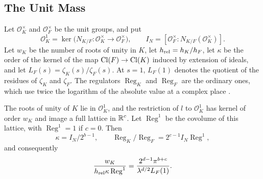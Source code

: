 \subsection{The Unit Mass}

Let $\mathcal O_K^\times$ and $\mathcal O_F^\times$ be the unit groups,
and put
\[
 \mathcal O_K^1=\ker\bigl(N_{K/F}\colon\mathcal O_K^\times\to
 \mathcal O_F^\times\bigr),
 \qquad I_N=[\mathcal O_F^\times:N_{K/F}(\mathcal O_K^\times)].
\]
Let $w_K$ be the number of roots of unity in $K$, let
$h_{\rm rel}=h_K/h_F$, let $\kappa$ be the order of the kernel of the
map $\operatorname{Cl}(F)\to\operatorname{Cl}(K)$ induced by extension of ideals, and let
$L_F(s)=\zeta_K(s)/\zeta_F(s)$. At $s=1$, $L_F(1)$ denotes the quotient
of the residues of $\zeta_K$ and $\zeta_F$. The regulators
$\operatorname{Reg}_K$ and $\operatorname{Reg}_F$ are the ordinary ones,
which use twice the logarithm of the absolute value at a complex place
\cite[Chapter~5]{MilneANT}.

\begin{proposition}\label{geo:mass}
The roots of unity of $K$ lie in $\mathcal O_K^1$, and the restriction of
$l$ to $\mathcal O_K^1$ has kernel of order $w_K$ and image a full
lattice in $\mathbb R^c$. Let $\operatorname{Reg}^1$ be the covolume of this
lattice, with $\operatorname{Reg}^1=1$ if $c=0$. Then
\[
 \kappa=I_N/2^{b-1},\qquad
 \operatorname{Reg}_K/\operatorname{Reg}_F=2^{c-1}I_N\operatorname{Reg}^1,
\]
and consequently
\begin{equation}\label{geo:mass-density}
 \frac{w_K}{h_{\rm rel}\kappa\operatorname{Reg}^1}
 =\frac{2^{d-1}\pi^{b+c}}{\lambda^{d/2}L_F(1)}.
\end{equation}
\end{proposition}

